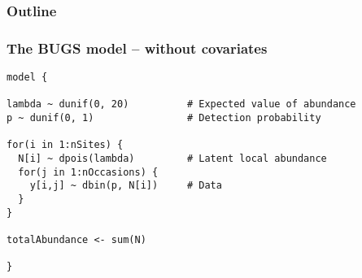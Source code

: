 \documentclass[color=usenames,dvipsnames]{beamer}\usepackage[]{graphicx}\usepackage[]{color}
\makeatletter
\newenvironment{kframe}{%
 \def\at@end@of@kframe{}%
 \ifinner\ifhmode%
  \def\at@end@of@kframe{\end{minipage}}%
  \begin{minipage}{\columnwidth}%
 \fi\fi%
 \def\FrameCommand##1{\hskip\@totalleftmargin \hskip-\fboxsep
 \colorbox{shadecolor}{##1}\hskip-\fboxsep
     \hskip-\linewidth \hskip-\@totalleftmargin \hskip\columnwidth}%
 \MakeFramed {\advance\hsize-\width
   \@totalleftmargin\z@ \linewidth\hsize
   \@setminipage}}%
 {\par\unskip\endMakeFramed%
 \at@end@of@kframe}
\newenvironment{knitrout}{}{} %
\makeatother
\begin{document}
\begin{frame}[plain]
  \frametitle{Outline}
  \Large
\end{frame}





\begin{frame}[fragile]
  \frametitle{The BUGS model -- without covariates}
\begin{knitrout}\scriptsize
{}\color{fgcolor}\begin{kframe}
\begin{verbatim}
model {

lambda ~ dunif(0, 20)          # Expected value of abundance
p ~ dunif(0, 1)                # Detection probability

for(i in 1:nSites) {
  N[i] ~ dpois(lambda)         # Latent local abundance
  for(j in 1:nOccasions) {
    y[i,j] ~ dbin(p, N[i])     # Data
  }
}

totalAbundance <- sum(N)

}
\end{verbatim}
\end{kframe}
\end{knitrout}

\end{frame}
\end{document}
